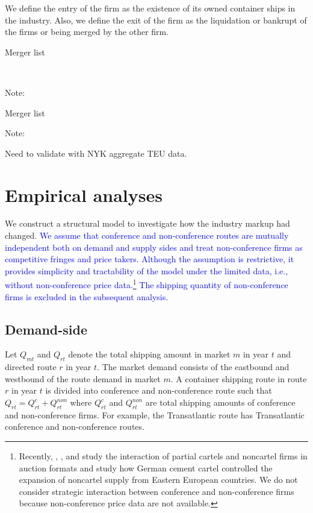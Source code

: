 \documentclass[10pt]{article}
\begin{document}
We define the entry of the firm as the existence of its owned container ships in the industry. 
Also, we define the exit of the firm as the liquidation or bankrupt of the firms or being merged by the other firm. 

\begin{table}[!htbp]
  \begin{center}
      \caption{Merger list}
      \label{tb:merger_list_CIY} 
      \subfloat[CIY (1966-1990)]{}\\
      \subfloat[HB (2005-2022)]{}
  \end{center}\footnotesize
  Note: 
\end{table} 

\begin{table}[!htbp]
  \begin{center}\footnotesize
      \caption{Merger list}
      \label{tb:merger_list_IHS} 
      \subfloat[IHS (1991-2005)]{}
  \end{center}\footnotesize
  Note: 
\end{table} 

Need to validate with NYK aggregate TEU data.

\section{Empirical analyses}\label{sec:empirical_analyses}
We construct a structural model to investigate how the industry markup had changed. 
\textcolor{blue}{
We assume that conference and non-conference routes are mutually independent both on demand and supply sides and treat non-conference firms as competitive fringes and price takers. Although the assumption is restrictive, it provides simplicity and tractability of the model under the limited data, i.e., without non-conference price data.\footnote{Recently, \cite{clark2018bid},  \cite{gabrielli2020assessment}, and
\cite{caoui2022study} study the interaction of partial cartels and noncartel firms in auction formats and \cite{harrington2018rent} study how German cement cartel controlled the expansion of noncartel supply from Eastern European countries. We do not consider strategic interaction between conference and non-conference firms because non-conference price data are not available.} The shipping quantity of non-conference firms is excluded in the subsequent analysis.
}

\subsection{Demand-side}
Let $Q_{mt}$ and $Q_{rt}$ denote the total shipping amount in market $m$ in year $t$ and directed route $r$ in year $t$. The market demand consists of the eastbound and westbound of the route demand in market $m$. A container shipping route in route $r$ in year $t$ is divided into conference and non-conference route such that 
$Q_{rt}=Q_{rt}^{c}+Q_{rt}^{non}$ where $Q_{rt}^{c}$ and $Q_{rt}^{non}$ are total shipping amounts of conference and non-conference firms. For example, the Transatlantic route has Transatlantic conference and non-conference routes. 
\end{document}
